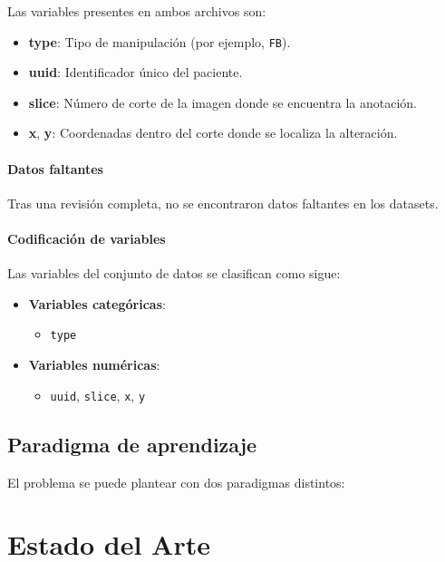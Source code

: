 \documentclass[conference]{IEEEtran}
\begin{document}
Las variables presentes en ambos archivos son:

\begin{itemize}
    \item \textbf{type}: Tipo de manipulación (por ejemplo, \texttt{FB}).
    \item \textbf{uuid}: Identificador único del paciente.
    \item \textbf{slice}: Número de corte de la imagen donde se encuentra la anotación.
    \item \textbf{x}, \textbf{y}: Coordenadas dentro del corte donde se localiza la alteración.
\end{itemize}


\paragraph{Datos faltantes}
Tras una revisión completa, no se encontraron datos faltantes en los datasets. 

\paragraph{Codificación de variables}

Las variables del conjunto de datos se clasifican como sigue:

\begin{itemize}
    \item \textbf{Variables categóricas}:
        \begin{itemize}
            \item \texttt{type}
        \end{itemize}
    \item \textbf{Variables numéricas}:
        \begin{itemize}
            \item \texttt{uuid}, \texttt{slice}, \texttt{x}, \texttt{y}
        \end{itemize}
\end{itemize}

\subsection{Paradigma de aprendizaje}

El problema se puede plantear con dos paradigmas distintos:


\section{Estado del Arte}
\end{document}
